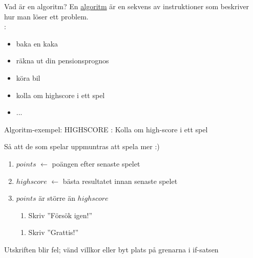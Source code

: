 \begin{Slide}{Vad är en algoritm?}
En \href{https://sv.wikipedia.org/wiki/Algoritm}{algoritm} är en sekvens av instruktioner som beskriver \\hur man löser ett problem.\\
\vspace{1em}
:
\begin{itemize}
\item	 baka en kaka
\pause\item räkna ut din pensionsprognos
\pause\item köra bil
\pause\item kolla om highscore i ett spel
\item ...
\end{itemize}

\end{Slide}


\ifkompendium\else
\begin{Slide}{Algoritm-exempel: HIGHSCORE}
: Kolla om high-score i ett spel \\ \vspace{1em}

 \pause Så att de som spelar uppmuntras att spela mer :) \\ \vspace{1em}

\pause
\begin{enumerate}
\item $points$ $\leftarrow$ poängen efter senaste spelet
\item $highscore$ $\leftarrow$ bästa resultatet innan senaste spelet
\item {} $points$ är större än $highscore$
\begin{enumerate}[ ~~]
\item  Skriv ''Försök igen!''
\end{enumerate}
\begin{enumerate}[ ~~]
\item  Skriv ''Grattis!''
\end{enumerate}
\end{enumerate}
\pause
\scriptsize {}

\pause Utskriften blir fel; vänd villkor eller byt plats på grenarna i if-satsen
\end{Slide}
\fi


